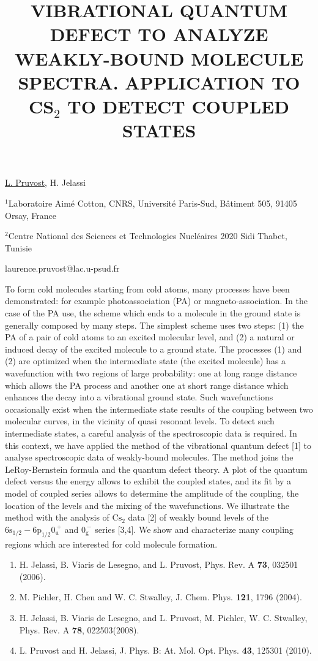 \title{VIBRATIONAL QUANTUM DEFECT TO ANALYZE WEAKLY-BOUND MOLECULE SPECTRA.
APPLICATION TO CS$_2$ TO DETECT COUPLED STATES}

\underline{L. Pruvost}, H. Jelassi  

{\normalsize{
\vspace{-4mm}$^1$Laboratoire Aim\'e Cotton, CNRS, Universit\'e Paris-Sud, B\^atiment 505, 91405 Orsay, France

\vspace{-4mm}$^2$Centre National des Sciences et Technologies Nucl\'eaires 2020 Sidi Thabet, Tunisie

\email laurence.pruvost@lac.u-psud.fr}}

To form cold molecules starting from cold atoms, many processes have been
demonstrated: for example photoassociation (PA) or magneto-association. In the case
of the PA use, the scheme which ends to a molecule in the ground state is generally composed
by many steps. The simplest scheme uses two steps: (1) the PA of a pair of cold atoms to an
excited molecular level, and (2) a natural or induced decay of the excited molecule to a
ground state.
The processes (1) and (2) are optimized when the intermediate state (the excited molecule)
has a wavefunction with two regions of large probability: one at long range distance which
allows the PA process and another one at short range distance which enhances the decay into
a vibrational ground state. Such wavefunctions occasionally exist when the intermediate state
results of the coupling between two molecular curves, in the vicinity of quasi resonant levels.
To detect such intermediate states, a careful analysis of the spectroscopic data is required.
In this context, we have applied the method of the vibrational quantum defect [1] to analyse
spectroscopic data of weakly-bound molecules. The method joins the LeRoy-Bernstein
formula and the quantum defect theory. A plot of the quantum defect versus the energy allows
to exhibit the coupled states, and its fit by a model of coupled series allows to determine the
amplitude of the coupling, the location of the levels and the mixing of the wavefunctions.
We illustrate the method with the analysis of $\textrm{Cs}_2$ data [2] of weakly bound levels of the
$6\textrm{s}_{1/2}-6\textrm{p}_{1/2} 0_\textrm{u}^{~+}$ and $0_\textrm{g}^{~-}$ series [3,4]. We show and characterize many coupling regions which
are interested for cold molecule formation.

\begin{enumerate}
\item H. Jelassi, B. Viaris de Lesegno, and L. Pruvost, Phys. Rev. A \textbf{73}, 032501 (2006).
\item M. Pichler, H. Chen and W. C. Stwalley, J. Chem. Phys. \textbf{121}, 1796 (2004).
\item H. Jelassi, B. Viaris de Lesegno, and L. Pruvost, M. Pichler, W. C. Stwalley, Phys. Rev. A \textbf{78}, 022503(2008).
\item L. Pruvost and H. Jelassi, J. Phys. B: At. Mol. Opt. Phys. \textbf{43}, 125301 (2010).
\end{enumerate}

\vspace{\baselineskip} 